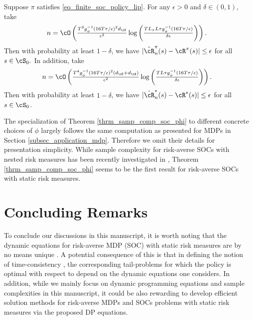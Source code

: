 \documentclass[9pt]{article}
\numberwithin{equation}{section}
\begin{document}
\begin{theorem} \label{thrm_samp_comp_soc_phi}
    Suppose $\pi$ satisfies \eqref{eq_finite_soc_policy_lip}. For any $\epsilon > 0$ and $\delta \in (0,1)$, take
    \begin{align*}
    n = \cO \left(\tfrac{T^3 g_\phi^{-1}(16T\tau/\epsilon)^2 d_\cS}{\epsilon^2} \log \left(\tfrac{T L_\pi L \tau g_\phi^{-1}(16T \tau /\epsilon)}{\delta \epsilon} \right)\right).
    \end{align*}
 Then with probability at least $1-\delta$, we have $|\hat{\cR}_n^\pi(s) - \cR^{\pi}(s)| \leq \epsilon$ for all $s \in \cS_0.$
    In addition, take
    \begin{align*}
    n = \cO \left(\tfrac{T^4 g_\phi^{-1}(16T \tau /\epsilon)^2 (d_\cS + d_\cA)}{\epsilon^2} \log \left(\tfrac{T L \tau g_\phi^{-1}(16T \tau /\epsilon)}{\delta \epsilon} \right)\right).
    \end{align*}
    Then with probability at least $1-\delta$, we have  $| \hat{\cR}^*_n(s)  -\cR^*(s) | \leq \epsilon $ for all $ s \in \cS_0$.
\end{theorem}

The specialization of Theorem \ref{thrm_samp_comp_soc_phi} to different concrete choices of $\phi$ largely follows the same computation as presented for MDPs in Section \ref{subsec_application_mdp}. 
Therefore  we omit their details for presentation simplicity. 
While sample complexity for risk-averse SOCs with nested risk measures has been recently investigated in \cite{shapiro2025risk}, Theorem \ref{thrm_samp_comp_soc_phi} seems to be the first result for risk-averse SOCs with static risk measures. 









\section{Concluding Remarks}
To conclude our discussions in this manuscript, it is worth noting that the dynamic equations for risk-averse MDP (SOC) with static risk measures are by no means unique \cite{bauerle2014more, muni2026reward,bauerle2011markov}. 
A potential consequence of this is that in defining the notion of time-consistency \cite{shapiro2009time}, the corresponding tail-problems for which the policy is optimal with respect to depend on the dynamic equations one considers. 
In addition, while we mainly focus on dynamic programming equations and sample complexities in this manuscript, it could be also rewarding to develop  efficient solution methods for risk-averse MDPs and SOCs problems with static risk measures via the proposed DP equations.




\end{document}

